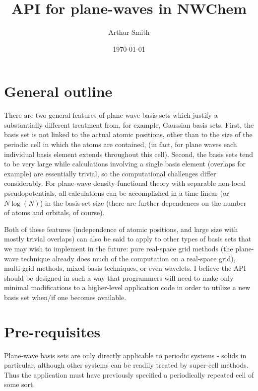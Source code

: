 

\title{API for plane-waves in NWChem}

\author{Arthur Smith}

\date{\today}
\maketitle

\section{General outline}
There are two general features of plane-wave basis sets which justify
a substantially different treatment from, for example, Gaussian basis
sets. First, the basis set is not linked to the actual atomic positions,
other than to the size of the periodic cell in which the atoms are contained,
(in fact, for plane waves each individual basis element extends throughout
this cell). Second, the basis sets tend to be very large while calculations
involving a single basis element (overlaps for example) are essentially
trivial, so the computational challenges differ considerably. For plane-wave
density-functional theory with separable non-local pseudopotentials,
all calculations can be accomplished in a time linear (or $N \log(N)$) in
the basis-set size (there are further dependences on the number of atoms
and orbitals, of course).

Both of these features (independence of atomic positions, and large
size with mostly trivial overlaps) can also be said to apply to
other types of basis sets that we may wish to implement in the future: 
pure real-space grid methods (the plane-wave technique already does
much of the computation on a real-space grid), multi-grid methods,
mixed-basis techniques, or even wavelets. I believe the API should
be designed in such a way that programmers will need to make only minimal
modifications to a higher-level application code in order to utilize
a new basis set when/if one becomes available.

\section{Pre-requisites}

Plane-wave basis sets are only directly applicable to periodic systems -
solids in particular, although other systems can be readily treated
by super-cell methods. Thus the application must have previously
specified a periodically repeated cell of some sort.

